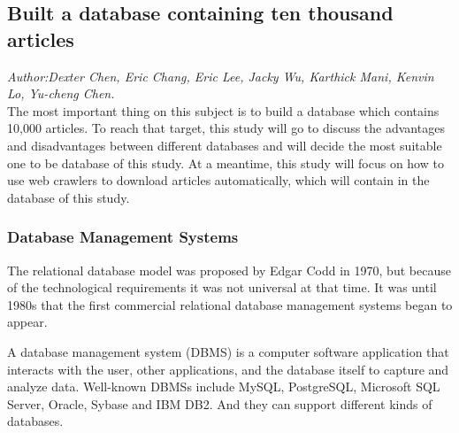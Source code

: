 	
\subsection{Built a database containing ten thousand articles}
\textit{\footnotesize Author:Dexter Chen, Eric Chang, Eric Lee, Jacky Wu, Karthick Mani, Kenvin Lo, Yu-cheng Chen.}\\

The most important thing on this subject is to build a database which contains 10,000 articles. To reach that target, this study will go to discuss the advantages and disadvantages between different databases and will decide the most suitable one to be database of this study. At a meantime, this study will focus on how to use web crawlers to download articles automatically, which will contain in the database of this study.  



\subsubsection*{Database Management Systems}

The relational database model was proposed by Edgar Codd in 1970, but because of the technological requirements it was not universal at that time. It was until 1980s that the first commercial relational database management systems began to appear.

A database management system (DBMS) is a computer software application that interacts with the user, other applications, and the database itself to capture and analyze data. Well-known DBMSs include MySQL, PostgreSQL, Microsoft SQL Server, Oracle, Sybase and IBM DB2. And they can support different kinds of databases.


